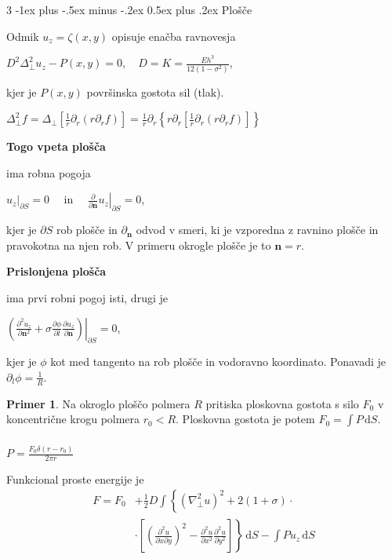 \documentclass[10pt,landscape]{article}
\makeatletter
\renewcommand{\section}{\@startsection{section}{1}{0mm}%
	{-1ex plus -.5ex minus -.2ex}%
	{0.5ex plus .2ex}%
	{\normalfont\large\bfseries}}
\theoremstyle{definition}
\newtheorem*{primer}{Primer}
\makeatother
\begin{document}
\begin{multicols}{3}
  \section{Plošče}

  Odmik \( u_z = \zeta (x, y) \) opisuje enačba ravnovesja

  \( D ^2 \Delta ^2_{\perp} u_z - P(x, y) = 0, \quad D = K = \frac{E h ^3}{12 (1 - \sigma ^2)} \),

  kjer je \( P(x, y) \) površinska gostota sil (tlak). 

  \( \Delta_{\perp} ^2 f = \Delta_{\perp} \left[ \frac{1}{r} \partial_r \left( r \partial_r f \right) \right] = \frac{1}{r} \partial_r \left\{ r \partial_r \left[ \frac{1}{r} \partial_r \left( r \partial_r f \right) \right] \right\} \)
  
  \textbf{Togo vpeta plošča}

  ima robna pogoja

  \( \left. u_z \right|_{\partial S} = 0 \quad \text{ in } \quad \left. \frac{\partial }{\partial \mathbf{n}} u_z \right|_{\partial S} = 0\),

  kjer je \( \partial S \) rob plošče in \( \partial_{\mathbf{n}} \) odvod v smeri, ki je vzporedna z ravnino plošče in pravokotna na njen rob. V primeru okrogle plošče je to \( \mathbf{n} = r \).

  \textbf{Prislonjena plošča}

  ima prvi robni pogoj isti, drugi je

  \( \left. \left( \frac{\partial ^2 u_{z}}{\partial \mathbf{n} ^2} + \sigma \frac{\partial \phi}{\partial l}  \frac{\partial u_{z}}{\partial \mathbf{n}}  \right)\right|_{\partial S} = 0 \),

  kjer je \( \phi \) kot med tangento na rob plošče in vodoravno koordinato. Ponavadi je \( \partial_l \phi = \frac{1}{R} \).

  \begin{primer}
    Na okroglo ploščo polmera \( R \) pritiska ploskovna gostota s silo \( F_0 \) v koncentrične krogu polmera \( r_0 < R \). Ploskovna gostota je potem \( F_0 = \int\limits_{}^{} P \, \mathrm{d} S \).

    \( P = \frac{F_0 \delta(r - r_0)}{2 \pi r} \)
  \end{primer}

  Funkcional proste energije je
  \vspace{-10pt}
  \begin{align*}
    F = F_0 &+ \frac{1}{2} D \int\limits_{}^{} \left\{ \left( \nabla ^2_{\perp} u \right) ^2 + 2 (1 + \sigma) \cdot \right. \\
    &\cdot \left. \left[ {\left( \frac{\partial ^2 u}{\partial x \partial y}  \right)}^2 - \frac{\partial ^2 u}{\partial x ^2} \frac{\partial ^2 u}{\partial y ^2}  \right] \right\} \, \mathrm{d} S - \int\limits_{}^{} P u_z \, \mathrm{d} S
  \end{align*}


\end{multicols}
\end{document}
